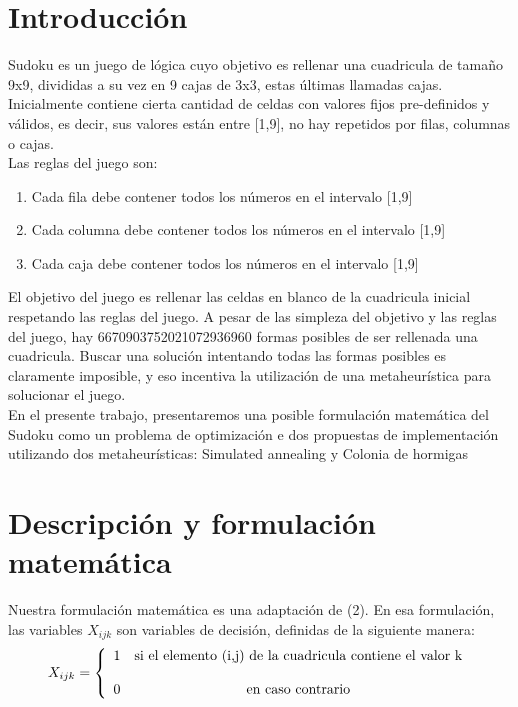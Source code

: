 \section{Introducción}
Sudoku es un juego de lógica cuyo objetivo es rellenar una cuadricula de tamaño 9x9, divididas a su vez en 9 cajas de 3x3, estas últimas llamadas cajas. Inicialmente contiene cierta cantidad de celdas con valores fijos pre-definidos y válidos, es decir, sus valores están entre [1,9], no hay repetidos por filas, columnas o cajas. \\Las reglas del juego son:
\begin{enumerate}
  \item Cada fila debe contener todos los números en el intervalo [1,9]
  \item Cada columna debe contener todos los números en el intervalo [1,9]
  \item Cada caja debe contener todos los números en el intervalo [1,9]
\end{enumerate}

El objetivo del juego es rellenar las celdas en blanco de la cuadricula inicial respetando las reglas del juego. A pesar de las simpleza del objetivo y las reglas del juego, hay 6670903752021072936960 formas posibles de ser rellenada una cuadricula. Buscar una solución intentando todas las formas posibles es claramente imposible, y eso incentiva la utilización de una metaheurística para solucionar el juego.\\
En el presente trabajo, presentaremos una posible formulación matemática del Sudoku como un problema de optimización e dos propuestas de implementación utilizando dos metaheurísticas: Simulated annealing y Colonia de hormigas

\section{Descripción y formulación matemática}


Nuestra formulación matemática es una adaptación de (2). En esa formulación, las variables $X_{ijk} $ son variables de decisión, definidas de la siguiente manera:
\[
X_{ijk}= \left\{ \begin{array}{lcc}
             1 &   $si el elemento (i,j) de la cuadricula contiene  el valor k$\\
             \\ 0 &  $en caso contrario$
             \end{array}
   \right.
   \]

